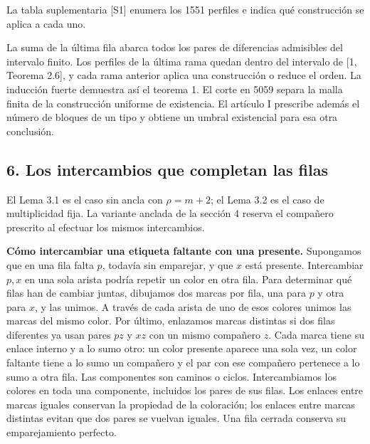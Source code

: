 \documentclass[spanish,11pt,a4paper]{article}
\begin{document}
La tabla suplementaria {[}S1{]} enumera los 1551 perfiles e indica qué construcción se aplica a cada uno.

La suma de la última fila abarca todos los pares de diferencias admisibles del intervalo finito. Los perfiles de la última rama quedan dentro del intervalo de {[}1, Teorema 2.6{]}, y cada rama anterior aplica una construcción o reduce el orden. La inducción fuerte demuestra así el teorema 1. El corte en 5059 separa la malla finita de la construcción uniforme de existencia. El artículo I prescribe además el número de bloques de un tipo y obtiene un umbral existencial para esa otra conclusión.

\subsection{6. Los intercambios que completan las filas}\label{los-intercambios-que-completan-las-filas}

El Lema 3.1 es el caso sin ancla con \(\rho=m+2\); el Lema 3.2 es el caso de multiplicidad fija. La variante anclada de la sección 4 reserva el compañero prescrito al efectuar los mismos intercambios.

\textbf{Cómo intercambiar una etiqueta faltante con una presente.} Supongamos que en una fila falta \(p\), todavía sin emparejar, y que \(x\) está presente. Intercambiar \(p,x\) en una sola arista podría repetir un color en otra fila. Para determinar qué filas han de cambiar juntas, dibujamos dos marcas por fila, una para \(p\) y otra para \(x\), y las unimos. A través de cada arista de uno de esos colores unimos las marcas del mismo color. Por último, enlazamos marcas distintas si dos filas diferentes ya usan pares \(pz\) y \(xz\) con un mismo compañero \(z\). Cada marca tiene su enlace interno y a lo sumo otro: un color presente aparece una sola vez, un color faltante tiene a lo sumo un compañero y el par con ese compañero pertenece a lo sumo a otra fila. Las componentes son caminos o ciclos. Intercambiamos los colores en toda una componente, incluidos los pares de sus filas. Los enlaces entre marcas iguales conservan la propiedad de la coloración; los enlaces entre marcas distintas evitan que dos pares se vuelvan iguales. Una fila cerrada conserva su emparejamiento perfecto.
\end{document}
